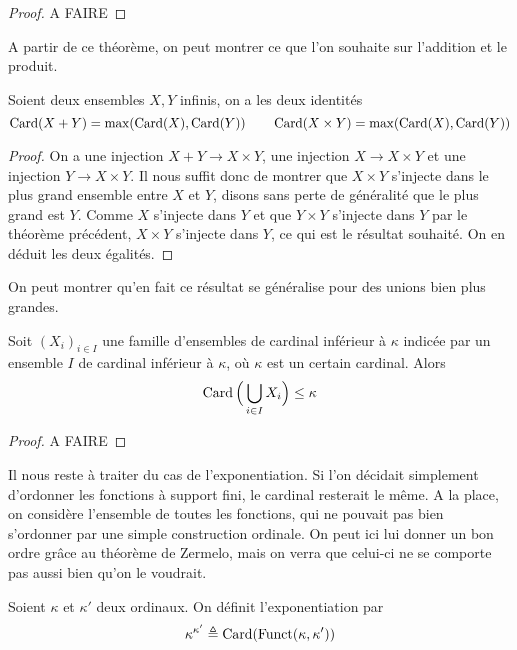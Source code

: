 \begin{proof}
  A FAIRE
\end{proof}

A partir de ce théorème, on peut montrer ce que l'on souhaite sur l'addition
et le produit.

\begin{proposition}
  Soient deux ensembles $X,Y$ infinis, on a les deux identités
  \[\operatorname{Card}(X+Y) = \max(\operatorname{Card}(X),\operatorname{Card}(Y))\qquad
  \operatorname{Card}(X\times Y) = \max(\operatorname{Card}(X),\operatorname{Card}(Y))\]
\end{proposition}

\begin{proof}
  On a une injection $X+Y\to X\times Y$, une injection $X\to X\times Y$ et une
  injection $Y\to X\times Y$. Il nous suffit donc de montrer que
  $X\times Y$ s'injecte dans le plus grand ensemble entre $X$ et $Y$, disons
  sans perte de généralité que le plus grand est $Y$. Comme $X$ s'injecte dans
  $Y$ et que $Y\times Y$ s'injecte dans $Y$ par le théorème précédent,
  $X\times Y$ s'injecte dans $Y$, ce qui est le résultat souhaité. On en déduit
  les deux égalités.
\end{proof}

On peut montrer qu'en fait ce résultat se généralise pour des unions bien plus
grandes.

\begin{proposition}
  Soit $(X_i)_{i\in I}$ une famille d'ensembles de cardinal inférieur à
  $\kappa$ indicée par un ensemble $I$ de cardinal inférieur à $\kappa$, où
  $\kappa$ est un certain cardinal. Alors
  \[\operatorname{Card}\Big(\bigcup_{i\in I} X_i\Big)\leq \kappa\]
\end{proposition}

\begin{proof}
  A FAIRE
\end{proof}

Il nous reste à traiter du cas de l'exponentiation. Si l'on décidait simplement
d'ordonner les fonctions à support fini, le cardinal resterait le même. A la
place, on considère l'ensemble de toutes les fonctions, qui ne pouvait pas
bien s'ordonner par une simple construction ordinale. On peut ici lui donner
un bon ordre grâce au théorème de Zermelo, mais on verra que celui-ci ne se
comporte pas aussi bien qu'on le voudrait.

\begin{definition}
  Soient $\kappa$ et $\kappa'$ deux ordinaux. On définit l'exponentiation
  par
  \[\kappa^{\kappa'} \triangleq \operatorname{Card}(\operatorname{Funct}(\kappa,\kappa'))\]
\end{definition}

